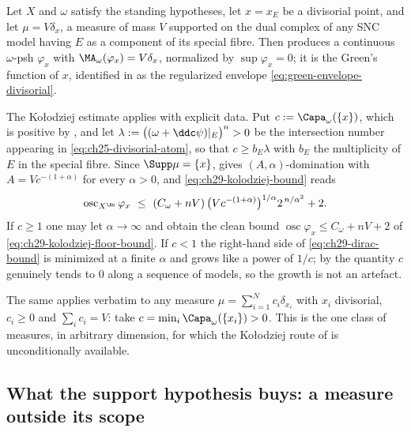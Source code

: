 \begin{example}
\label{ex:ch29-divisorial-dirac}
Let \(X\) and \(\omega\) satisfy the standing hypotheses, let
\(x=x_E\) be a divisorial point, and let \(\mu=V\delta_x\), a measure of mass
\(V\) supported on the dual complex of any SNC model having \(E\) as a
component of its special fibre.  Then
 produces a continuous
\(\omega\)-psh \(\varphi_x\) with
\(\MA_\omega(\varphi_x)=V\delta_x\), normalized by \(\sup\varphi_x=0\); it
is the Green's function of \(x\), identified in
 as the regularized envelope
\eqref{eq:green-envelope-divisorial}.

The Ko\l odziej estimate applies with explicit data.  Put
\(c:=\Capa_\omega(\{x\})\), which is positive by
, and let
\(\lambda:=\bigl((\omega+\ddc\psi)|_E\bigr)^n>0\) be the intersection number
appearing in \eqref{eq:ch25-divisorial-atom}, so that
\(c\geq b_E\lambda\) with \(b_E\) the multiplicity of \(E\) in the special
fibre.  Since \(\Supp\mu=\{x\}\),  gives
\((A,\alpha)\)-domination with \(A=Vc^{-(1+\alpha)}\) for every
\(\alpha>0\), and \eqref{eq:ch29-kolodziej-bound} reads
\begin{equation}
\label{eq:ch29-dirac-bound}
 \operatorname{osc}_{X^{\An}}\varphi_x
 \ \leq\ (C_\omega+nV)\,
   \bigl(Vc^{-(1+\alpha)}\bigr)^{1/\alpha}2^{\,n/\alpha^2}+2 .
\end{equation}
If \(c\geq1\) one may let \(\alpha\to\infty\) and obtain the clean bound
\(\operatorname{osc}\varphi_x\leq C_\omega+nV+2\) of
\eqref{eq:ch29-kolodziej-floor-bound}.  If \(c<1\) the right-hand side of
\eqref{eq:ch29-dirac-bound} is minimized at a finite \(\alpha\) and grows
like a power of \(1/c\); by  the quantity
\(c\) genuinely tends to \(0\) along a sequence of models, so the growth is
not an artefact.

The same applies verbatim to any measure
\(\mu=\sum_{i=1}^Nc_i\delta_{x_i}\) with \(x_i\) divisorial,
\(c_i\geq0\) and \(\sum_ic_i=V\): take
\(c=\min_i\Capa_\omega(\{x_i\})>0\).  This is the one class of measures,
in arbitrary dimension, for which the Ko\l odziej route of
 is unconditionally available.
\end{example}

\subsection{What the support hypothesis buys: a measure outside its scope}
\label{sec:ch29-ex-boundary}


